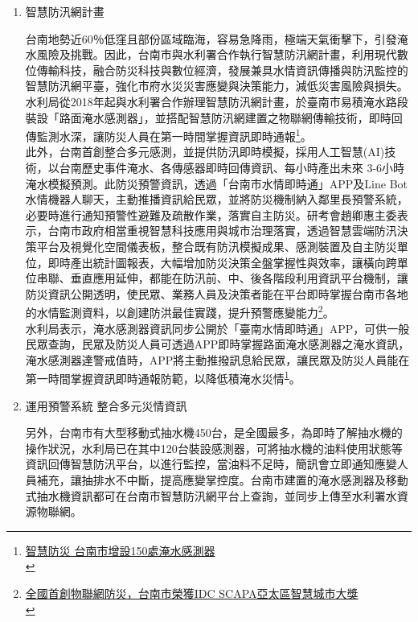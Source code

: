 \documentclass[a4paper,12pt]{article}
\begin{document}
\begin{enumerate}
\item 智慧防汛網計畫
\label{sec:org5562e09}

台南地勢近60％低窪且部份區域臨海，容易急降雨，極端天氣衝擊下，引發淹水風險及挑戰。因此，台南市與水利署合作執行智慧防汛網計畫，利用現代數位傳輸科技，融合防災科技與數位經濟，發展兼具水情資訊傳播與防汛監控的智慧防汛網平臺，強化市府水災災害應變與決策能力，減低災害風險與損失。水利局從2018年起與水利署合作辦理智慧防汛網計畫，於臺南市易積淹水路段裝設「路面淹水感測器」，並搭配智慧防汛網建置之物聯網傳輸技術，即時回傳監測水深，讓防災人員在第一時間掌握資訊即時通報\footnote{\href{https://www.chinatimes.com/realtimenews/20201204005753-260421?chdtv}{智慧防災 台南市增設150處淹水感測器}\\\label{org80a8e06}}。\\

此外，台南首創整合多元感測，並提供防汛即時模擬，採用人工智慧(AI)技術，以台南歷史事件淹水、各傳感器即時回傳資訊、每小時產出未來 3-6小時淹水模擬預測。此防災預警資訊，透過「台南市水情即時通」APP及Line Bot水情機器人聊天，主動推播資訊給民眾，並將防災機制納入鄰里長預警系統，必要時進行通知預警性避難及疏散作業，落實自主防災。研考會趙卿惠主委表示，台南市政府相當重視智慧科技應用與城市治理落實，透過智慧雲端防汛決策平台及視覺化空間儀表板，整合既有防汛模擬成果、感測裝置及自主防災單位，即時產出統計圖報表，大幅增加防災決策全盤掌握性與效率，讓橫向跨單位串聯、垂直應用延伸，都能在防汛前、中、後各階段利用資訊平台機制，讓防災資訊公開透明，使民眾、業務人員及決策者能在平台即時掌握台南市各地的水情監測資料，以創建防洪最佳實踐，提升預警應變能力\footnote{\href{https://www.tainan.gov.tw/News\_Content.aspx?n=13370\&s=7677244}{全國首創物聯網防災，台南市榮獲IDC SCAPA亞太區智慧城市大獎}\\}。\\

水利局表示，淹水感測器資訊同步公開於「臺南水情即時通」APP，可供一般民眾查詢，民眾及防災人員可透過APP即時掌握路面淹水感測器之淹水資訊，淹水感測器達警戒值時，APP將主動推撥訊息給民眾，讓民眾及防災人員能在第一時間掌握資訊即時通報防範，以降低積淹水災情\textsuperscript{\ref{org80a8e06}}。\\
\item 運用預警系統 整合多元災情資訊
\label{sec:org5312a8f}

另外，台南市有大型移動式抽水機450台，是全國最多，為即時了解抽水機的操作狀況，水利局已在其中120台裝設感測器，可將抽水機的油料使用狀態等資訊回傳智慧防汛平台，以進行監控，當油料不足時，簡訊會立即通知應變人員補充，讓抽排水不中斷，提高應變掌控度。台南市建置的淹水感測器及移動式抽水機資訊都可在台南市智慧防汛網平台上查詢，並同步上傳至水利署水資源物聯網。\\


\end{enumerate}
\end{document}
